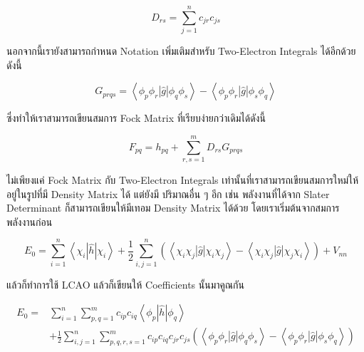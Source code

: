 \begin{equation}
    \label{eq:Density Matrix}
    D_{r s} = \sum_{j=1}^n c_{j r} c_{j s}
\end{equation}

นอกจากนี้เรายังสามารถกำหนด Notation เพิ่มเติมสำหรับ Two-Electron Integrals ได้อีกด้วย ดังนี้

\begin{equation}
    \label{eq:two_electron_integral}
    G_{p r q s}
    =
    \left\langle\phi_p \phi_r|\hat{g}| \phi_q \phi_s\right\rangle
    - \left\langle\phi_p \phi_r|\hat{g}| \phi_s \phi_q\right\rangle
\end{equation}

\noindent ซึ่งทำให้เราสามารถเขียนสมการ Fock Matrix ที่เรียบง่ายกว่าเดิมได้ดังนี้

\begin{equation}
    \label{eq:Fock_Matrix}
    F_{p q}
    =
    h_{p q}+\sum_{r, s=1}^m D_{r s} G_{p r q s}
\end{equation}

ไม่เพียงแค่ Fock Matrix กับ Two-Electron Integrals เท่านั้นที่เราสามารถเขียนสมการใหม่ให้อยู่ในรูปที่มี Density Matrix ได้ แต่ยังมี%
ปริมาณอื่น ๆ อีก เช่น พลังงานที่ได้จาก Slater Determinant ก็สามารถเขียนให้มีเทอม Density Matrix ได้ด้วย โดยเราเริ่มต้นจากสมการ%
พลังงานก่อน

\begin{equation}
    E_0
    =
    \sum_{i=1}^n \left\langle\chi_i|\hat{h}| \chi_i\right\rangle
    + \frac{1}{2}
    \sum_{i, j=1}^n \left(\left\langle\chi_i \chi_j|\hat{g}| \chi_i \chi_j\right\rangle \right.
    - \left. \left\langle\chi_i \chi_j|\hat{g}| \chi_j \chi_i\right\rangle\right)+V_{n n}
\end{equation}

\noindent แล้วก็ทำการใช้ LCAO แล้วก็เขียนให้ Coefficients นั้นมาคูณกัน

\begin{equation}
    \begin{aligned}
        E_0
        =
         & \sum_{i=1}^n \sum_{p, q=1}^m c_{i p} c_{i q}\left\langle\phi_p|\hat{h}| \phi_q\right\rangle \\
         & + \frac{1}{2}
        \sum_{i, j=1}^n
        \sum_{p, q, r, s=1}^m
        c_{i p} c_{i q} c_{j r} c_{j s}
        \left(
        \left\langle\phi_p \phi_r|\hat{g}| \phi_q \phi_s\right\rangle
        - \left\langle\phi_p \phi_r|\hat{g}| \phi_s \phi_q\right\rangle
        \right)
    \end{aligned}
\end{equation}

